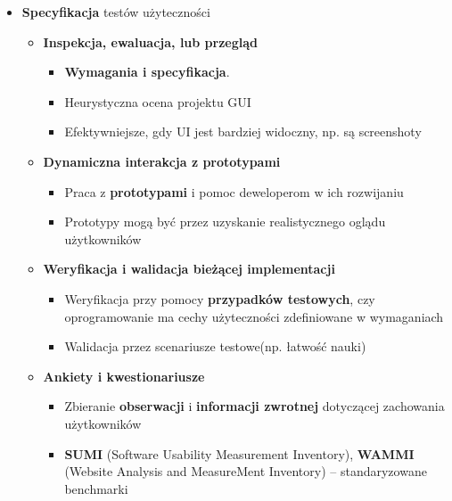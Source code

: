 \documentclass[../main.tex]{subfiles}
\begin{document}
\begin{itemize}
        \item \textbf{Specyfikacja} testów użyteczności
        \begin{itemize}
            \item \textbf{Inspekcja, ewaluacja, lub przegląd}
            \begin{itemize}
                \item \textbf{Wymagania i specyfikacja}.
                \item Heurystyczna ocena projektu GUI
                \item Efektywniejsze, gdy UI jest bardziej widoczny, np. są screenshoty
            \end{itemize}

            \item \textbf{Dynamiczna interakcja z prototypami}
            \begin{itemize}
                \item Praca z \textbf{prototypami} i pomoc deweloperom w ich rozwijaniu
                \item Prototypy mogą być przez uzyskanie realistycznego oglądu użytkowników
            \end{itemize}

            \item \textbf{Weryfikacja i walidacja bieżącej implementacji}
            \begin{itemize}
                \item Weryfikacja przy pomocy \textbf{przypadków testowych}, czy oprogramowanie ma cechy użyteczności
                zdefiniowane w wymaganiach
                \item Walidacja przez scenariusze testowe(np. łatwość nauki)
            \end{itemize}

            \item \textbf{Ankiety i kwestionariusze}
            \begin{itemize}
                \item Zbieranie \textbf{obserwacji} i \textbf{informacji zwrotnej} dotyczącej zachowania użytkowników
                \item \textbf{SUMI} (Software Usability Measurement Inventory), \textbf{WAMMI} (Website Analysis and MeasureMent Inventory)
                – standaryzowane benchmarki
            \end{itemize}
        \end{itemize}
    \end{itemize}
\end{document}
